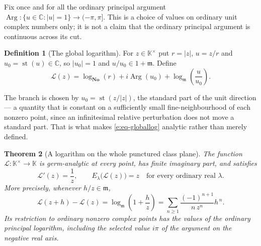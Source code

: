 \documentclass[11pt,a4paper]{article}
\numberwithin{equation}{section}
\newtheorem{theorem}{Theorem}[section]
\theoremstyle{definition}
\newtheorem{definition}[theorem]{Definition}
\theoremstyle{remark}
\theoremstyle{plain}
\newcommand{\K}{\mathbb K}
\newcommand{\No}{\mathbf{No}}
\newcommand{\CC}{\mathbb C}
\newcommand{\mm}{\mathfrak m}
\DeclareMathOperator{\st}{st}
\DeclareMathOperator{\Arg}{Arg}
\newcommand{\abs}[1]{\lvert #1\rvert}
\begin{document}
Fix once and for all the ordinary principal argument
$\Arg:\{u\in\CC:\abs u=1\}\to(-\pi,\pi]$.  This is a choice of values on
ordinary unit complex numbers only; it is not a claim that the ordinary
principal argument is continuous across its cut.

\begin{definition}[The global logarithm]\label{e:def-globallog}
For $z\in\K^{\times}$ put $r=\abs z$, $u=z/r$ and $u_0=\st(u)\in\CC$, so
$\abs{u_0}=1$ and $u/u_0\in1+\mm$.  Define
\begin{equation}\label{e:eq-globallog}
 \mathcal L(z)=\log_{\No}(r)+i\Arg(u_0)+\log_{\mm}\!\left(\frac{u}{u_0}\right).
\end{equation}
\end{definition}

The branch is chosen by $u_0=\st(z/\abs z)$, the standard part of the unit
direction --- a quantity that is constant on a sufficiently small
fine-neighbourhood of each nonzero point, since
an infinitesimal relative perturbation does not move a standard part.  That
is what makes \eqref{e:eq-globallog} analytic rather than merely defined.

\begin{theorem}[A logarithm on the whole punctured class plane]
\label{e:thm-globallog}
The function $\mathcal L:\K^{\times}\to\K$ is germ-analytic at every
point, has finite imaginary part, and satisfies
\[
 \mathcal L'(z)=\frac1z,
 \qquad E_\lambda\bigl(\mathcal L(z)\bigr)=z
 \quad\text{for every ordinary real }\lambda .
\]
More precisely, whenever $h/z\in\mm$,
\begin{equation}\label{e:eq-loglocal}
 \mathcal L(z+h)-\mathcal L(z)=\log_{\mm}\!\left(1+\frac hz\right)
 =\sum_{n\ge1}\frac{(-1)^{n+1}}{n\,z^{n}}h^{\,n}.
\end{equation}
Its restriction to ordinary nonzero complex points has the values of the
ordinary principal logarithm, including the selected value $i\pi$ of the
argument on the negative real axis.
\end{theorem}
\end{document}
